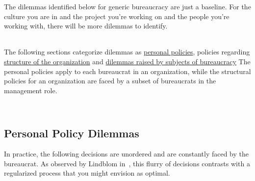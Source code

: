 The dilemmas identified below for generic bureaucracy are just a baseline. For the culture you are in and the project you're working on and the people you're working with, there will be more dilemmas to identify. 

\ \\

The following sections categorize dilemmas as \hyperref[sec:personal-policy-dilemmas]{personal policies}, 
policies regarding \hyperref[sec:org-dilemma]{structure of the organization}\iftoggle{haspagenumbers}{page~\pageref{sec:org-dilemma},}{,}
and \hyperref[sec:subjects-dilemmas]{dilemmas raised by subjects of bureaucracy}\iftoggle{haspagenumbers}{page~\pageref{sec:subjects-dilemmas}.}{.}
The personal policies apply to each bureaucrat in an organization, while the structural policies for an organization are faced by a subset of bureaucrats in the management role. 



\ \\


\subsection*{Personal Policy Dilemmas \label{sec:personal-policy-dilemmas}}


In practice, the following decisions are unordered and are constantly faced by the bureaucrat. As observed by Lindblom in~\cite{1959_Lindblom}, this flurry of decisions contrasts with a regularized process that you might envision as optimal.


